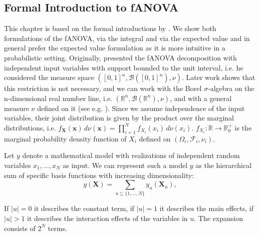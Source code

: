 \subsection{Formal Introduction to fANOVA}
This chapter is based on the formal introductions by \cite{rahman2014, sobol1993sensitivity, sobol2001, hooker2004, owen2013, muehlenstaedt2012}. We show both formulations of the fANOVA, via the integral and via the expected value and in general prefer the expected value formulation as it is more intuitive in a probabilistic setting.
Originally, \cite{sobol1993sensitivity} presented the fANOVA decomposition with independent input variables with support bounded to the unit interval, i.e. he considered the measure space $([0, 1]^n, \mathcal{B}([0, 1]^n), \nu)$. Later work shows that this restriction is not necessary, and we can work with the Borel $\sigma$-algebra on the n-dimensional real number line, i.e. $(\mathbb{R}^n, \mathcal{B}(\mathbb{R}^n), \nu)$, and with a general measure $\nu$ defined on it (see e.g. \cite{rahman2014}).
Since we assume independence of the input variables, their joint distribution is given by the product over the marginal distributions, i.e. \(f_{\boldsymbol{X}}(\boldsymbol{x}) \, d\nu(\boldsymbol{x}) = \prod_{i=1}^{N} f_{X_i}(x_i) \, d\nu(x_i)\). \(f_{X_i}: \mathbb{R} \rightarrow \mathbb{R}_{0}^{+}\) is the marginal probability density function of \(X_i\) defined on $(\Omega_i, \mathcal{F}_i, \nu_i)$.

\begin{definition}
Let $y$  denote a mathematical model with realizations of independent random variables $x_1, \dots, x_N$ as input. We can represent such a model $y$ as the hierarchical sum of specific basis functions with increasing dimensionality:
\begin{equation}
    y(\boldsymbol{X}) = \sum_{u \subseteq \{1, \dots, N\}} y_{u}(\boldsymbol{X}_u),
    \label{eq:fanova_decomposition}
\end{equation}
\end{definition}

If $|u| = 0$ it describes the constant term, if $|u| = 1$ it describes the main effects, if $|u| > 1$ it describes the interaction effects of the variables in $u$. The expansion consists of $2^N$ terms.\par


